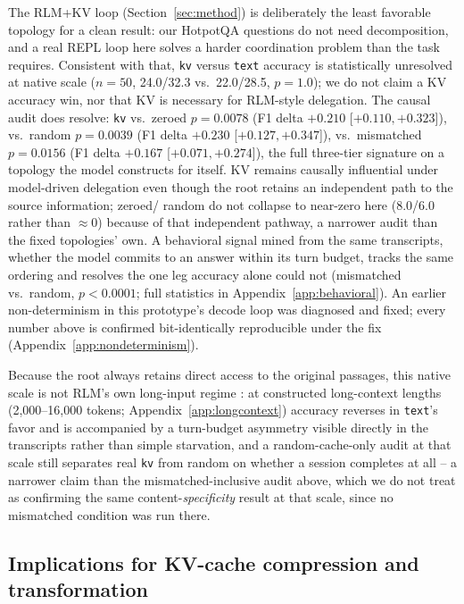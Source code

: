 \documentclass[11pt]{article}
\begin{document}
The RLM+KV loop (Section~\ref{sec:method}) is deliberately the least
favorable topology for a clean result: our HotpotQA questions do not
need decomposition, and a real REPL loop here solves a harder
coordination problem than the task requires. Consistent with that,
\texttt{kv} versus \texttt{text} accuracy is statistically unresolved
at native scale ($n=50$, 24.0/32.3 vs.\ 22.0/28.5, $p=1.0$); we do not
claim a KV accuracy win, nor that KV is necessary for RLM-style
delegation. The causal audit does resolve: \texttt{kv} vs.\ zeroed
$p=0.0078$ (F1 delta $+0.210$ [$+0.110,+0.323$]), vs.\ random
$p=0.0039$ (F1 delta $+0.230$ [$+0.127,+0.347$]), vs.\ mismatched
$p=0.0156$ (F1 delta $+0.167$ [$+0.071,+0.274$]), the full three-tier
signature on a topology the model constructs for itself. KV remains
causally influential under model-driven delegation even though the
root retains an independent path to the source information; zeroed/
random do not collapse to near-zero here (8.0/6.0 rather than
$\approx$0) because of that independent pathway, a narrower audit than
the fixed topologies' own. A behavioral signal mined from the same
transcripts, whether the model commits to an answer within its turn
budget, tracks the same ordering and resolves the one leg accuracy
alone could not (mismatched vs.\ random, $p<0.0001$; full statistics in
Appendix~\ref{app:behavioral}). An earlier non-determinism in this
prototype's decode loop was diagnosed and fixed; every number above is
confirmed bit-identically reproducible under the fix
(Appendix~\ref{app:nondeterminism}).

Because the root always retains direct access to the original
passages, this native scale is not RLM's own long-input regime
\citep{rlm2026}: at constructed long-context lengths (2,000--16,000
tokens; Appendix~\ref{app:longcontext}) accuracy reverses in
\texttt{text}'s favor and is accompanied by a turn-budget asymmetry
visible directly in the transcripts rather than simple starvation, and
a random-cache-only audit at that scale still separates real
\texttt{kv} from random on whether a session completes at all -- a
narrower claim than the mismatched-inclusive audit above, which we do
not treat as confirming the same content-\emph{specificity} result at
that scale, since no mismatched condition was run there.

\subsection{Implications for KV-cache compression and transformation}
\end{document}
